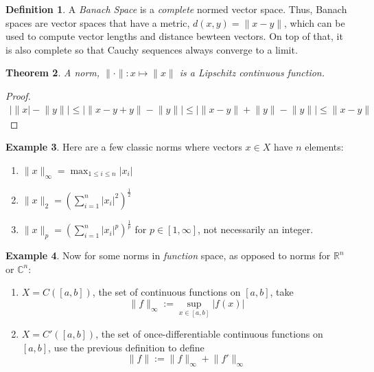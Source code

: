 \documentclass[12pt]{article}
\theoremstyle{plain}
\newtheorem{thm}{Theorem}[subsection]
\theoremstyle{definition}
\newtheorem{defn}[thm]{Definition}
\newtheorem{ex}[thm]{Example}
\theoremstyle{remark}
\begin{document}
\begin{defn} 
\label{defn.banach}
A \emph{Banach Space} is a \emph{complete} normed vector space. Thus, Banach spaces are vector spaces that have a metric, $d(x,y)=\lVert x-y\rVert$, which can be used to compute vector lengths and distance bewteen vectors. On top of that, it is also complete so that Cauchy sequences always converge to a limit.
\end{defn}

\begin{thm}
A norm, $\lVert\cdot\rVert: x\mapsto \rVert x \lVert$ is a Lipschitz continuous function.
\end{thm}
\begin{proof}
\begin{align*}
    \bigl\lvert \lVert x \rvert - \lVert y\rVert \bigr\rvert
    \leq 
    \bigl\lvert \lVert x - y + y\rVert - \lVert y\rVert \bigr\rvert
    \leq
    \bigl\lvert \lVert x - y \rVert + \lVert y\rVert - \lVert y\rVert \bigr\rvert
    \leq
    \lVert x - y \rVert 
\end{align*}
\end{proof}

\begin{ex}
Here are a few classic norms where vectors $x\in X$ have $n$ elements:
\begin{enumerate}
\item $\lVert x\rVert_\infty = \max_{1\leq i\leq n} |x_i|$
\item $\lVert x\rVert_2 = \left(\sum_{i=1}^n |x_i|^2\right)^{\frac{1}{2}}$ 
\item $\lVert x\rVert_p = \left(\sum_{i=1}^n |x_i|^p\right)^{\frac{1}{p}}$ for $p\in[1,\infty]$, not necessarily an integer.
\end{enumerate}
\end{ex}

\begin{ex} Now for some norms in \emph{function} space, as opposed to norms for $\mathbb{R}^n$ or $\mathbb{C}^n$:
\begin{enumerate}
\item $X=C([a,b])$, the set of continuous functions on $[a,b]$, take 
\[
    \lVert f\rVert_\infty :=
    \sup_{x\in[a,b]} |f(x)|
\]
\item $X=C'([a,b])$, the set of once-differentiable continuous functions on $[a,b]$, use the previous definition to define
\[
    \lVert f\rVert := \lVert f\rVert_\infty + \lVert f'\rVert_\infty
\]
\end{enumerate}
\end{ex}
\end{document}
